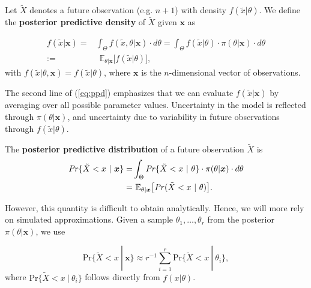 \begin{definition}
	Let $\tilde{X}$ denotes a future observation (e.g. $n+1$) with density $f(\tilde{x}|\theta)$. We define the \textbf{posterior predictive density} of $\tilde{X}$ given $\boldsymbol{x}$ as 
	
	\begin{equation}\label{eq:ppd}
	\begin{aligned}
	f(\tilde{x}|\boldsymbol{x})
	= & \int_{\Theta}f(\tilde{x},\theta | \boldsymbol{x})\cdot d\theta=\int_{\Theta} f(\tilde{x}|\theta)\cdot \pi (\theta|\boldsymbol{x})\cdot d\theta
	\\ := & \ \ \mathbb{E}_{\theta|\boldsymbol{x}}\big[f(\tilde{x}|\theta)\big],
	\end{aligned}
	\end{equation}
	with $f(\tilde{x}|\theta,\boldsymbol{x})=f(\tilde{x}|\theta)$, where $\boldsymbol{x}$ is the $n$-dimensional vector of observations.
\end{definition}
The second line of (\ref{eq:ppd}) emphasizes that we can evaluate $f(\tilde{x}|\boldsymbol{x})$ by averaging over all possible parameter values.
Uncertainty in the model is reflected through $\pi(\theta|\boldsymbol{x})$, and uncertainty due to variability in future observations through $f(\tilde{x}|\theta)$.

\begin{definition}
	The \textbf{posterior predictive distribution} of a future observation $\tilde{X}$ is
	\begin{equation}
	\begin{aligned}
	\text{\emph{Pr}}\{\tilde{X}<x\ | \ \boldsymbol{x}\}= &\int_{\Theta}\text{\emph{Pr}}\{\tilde{X}<x \ | \ \theta \} \cdot \pi(\theta|\boldsymbol{x})\cdot d\theta \\ 
	= & \ \mathbb{E}_{\theta|\boldsymbol{x}}\big[\text{\emph{Pr}}(\tilde{X}<x \ | \ \theta)\big].
	\end{aligned}
	\end{equation}
\end{definition}
However, this quantity is difficult to obtain analytically. Hence, we will more rely on simulated approximations. Given a sample $\theta_1,\dots,\theta_r$ from the posterior $\pi(\theta|\boldsymbol{x})$, we use 

\begin{equation}
\text{Pr}\{\tilde{X}<x\ | \ \boldsymbol{x}\}\approx r^{-1}\sum_{i=1}^r\text{Pr}\{\tilde{X}<x \ | \ \theta_i\},
\end{equation}
where $\text{Pr}\{\tilde{X}<x \ | \ \theta_i\}$ follows directly from $f(x|\theta)$. 

